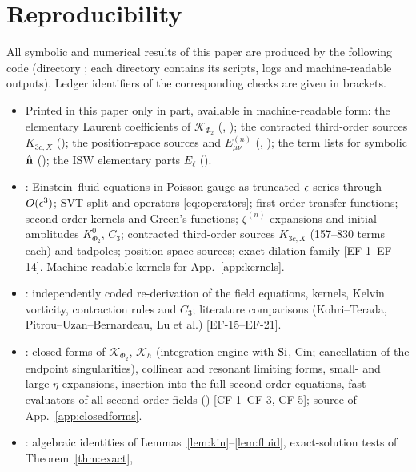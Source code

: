 \section{Reproducibility}
\label{app:repro}
\begingroup\sloppy
All symbolic and numerical results of this paper are produced by the following code (directory ; each directory
contains its scripts, logs and machine-readable outputs).  Ledger identifiers of the corresponding checks are given in brackets.
\begin{itemize}\itemsep1pt
\item Printed in this paper only in part, available in machine-readable form: the elementary Laurent coefficients of $\mathcal K_{\Phi_2}$
(, ); the contracted third-order sources $K_{3c,X}$
(); the position-space sources and $E^{(n)}_{\mu\nu}$ (, ); the
term lists for symbolic $\hat{\mathbf n}$ (); the ISW elementary parts $E_\ell$ ().
\item {}: Einstein--fluid equations in Poisson gauge as truncated $\epsilon$-series through $O(\epsilon^3)$; SVT split and
operators \eqref{eq:operators}; first-order transfer functions; second-order kernels and Green's functions; $\zeta^{(n)}$ expansions and
initial amplitudes $K^0_{\Phi_2}$, $C_3$; contracted third-order sources $K_{3c,X}$ (157--830 terms each) and tadpoles; position-space sources;
exact dilation family [EF-1--EF-14].  Machine-readable kernels for App.~\ref{app:kernels}.
\item {}: independently coded re-derivation of the field equations, kernels, Kelvin vorticity, contraction rules and $C_3$;
literature comparisons (Kohri--Terada, Pitrou--Uzan--Bernardeau, Lu et al.) [EF-15--EF-21].
\item {}: closed forms of $\mathcal K_{\Phi_2}$, $\mathcal K_h$ (integration engine with $\operatorname{Si}$, $\mathrm{Cin}$; cancellation of
the endpoint singularities), collinear and resonant limiting forms, small- and large-$\eta$ expansions, insertion into the full second-order
equations, fast evaluators of all second-order fields () [CF-1--CF-3, CF-5]; source of App.~\ref{app:closedforms}.
\item {}: algebraic identities of Lemmas~\ref{lem:kin}--\ref{lem:fluid}, exact-solution tests of Theorem~\ref{thm:exact},

\end{itemize}
